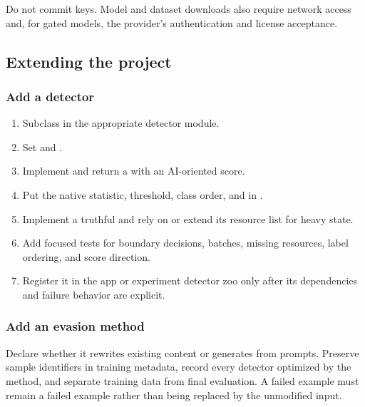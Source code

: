 Do not commit keys. Model and dataset downloads also require network
access and, for gated models, the provider's authentication and license
acceptance.

\subsection{Extending the
project}\label{record-docs-research-guide-md-extending-the-project}

\subsubsection{Add a
detector}\label{record-docs-research-guide-md-add-a-detector}

\begin{enumerate}
\def\labelenumi{\arabic{enumi}.}
\tightlist
\item
  Subclass \texttt{} in the appropriate detector
  module.
\item
  Set \texttt{} and \texttt{}.
\item
  Implement \texttt{} and return a
  \texttt{} with an AI-oriented score.
\item
  Put the native statistic, threshold, class order, and
  \texttt{} in \texttt{}.
\item
  Implement a truthful \texttt{} and rely on
  \texttt{} or extend its resource list for heavy
  state.
\item
  Add focused tests for boundary decisions, batches, missing resources,
  label ordering, and score direction.
\item
  Register it in the app or experiment detector zoo only after its
  dependencies and failure behavior are explicit.
\end{enumerate}

\subsubsection{Add an evasion
method}\label{record-docs-research-guide-md-add-an-evasion-method}

Declare whether it rewrites existing content or generates from prompts.
Preserve sample identifiers in training metadata, record every detector
optimized by the method, and separate training data from final
evaluation. A failed example must remain a failed example rather than
being replaced by the unmodified input.

